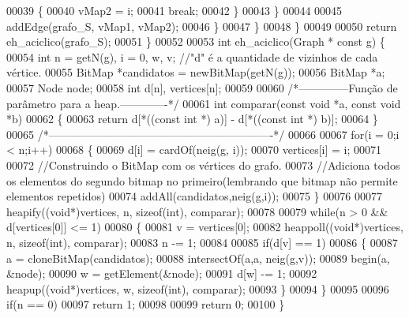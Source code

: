 \begin{DoxyCode}
00039                     \{
00040                         vMap2 = i;
00041                         \textcolor{keywordflow}{break};
00042                     \}
00043                 \}
00044 
00045                                 addEdge(grafo\_S, vMap1, vMap2);
00046                         \}
00047                 \}
00048         \}
00049 
00050         \textcolor{keywordflow}{return} eh_aciclico(grafo\_S);
00051 \}
00052 
00053 \textcolor{keywordtype}{int} eh_aciclico(Graph * \textcolor{keyword}{const} g) \{
00054         \textcolor{keywordtype}{int} n = getN(g), i = 0, w, v; \textcolor{comment}{//"d" é a quantidade de vizinhos de cada vértice.}
00055         BitMap *candidatos = newBitMap(getN(g));
00056         BitMap *a;
00057         Node node;
00058     \textcolor{keywordtype}{int} d[n], vertices[n];
00059 
00060     \textcolor{comment}{/*--------------Função de parâmetro para a heap.-------------*/}
00061     \textcolor{keywordtype}{int} comparar(\textcolor{keyword}{const} \textcolor{keywordtype}{void} *a, \textcolor{keyword}{const} \textcolor{keywordtype}{void} *b) 
00062     \{
00063         \textcolor{keywordflow}{return} d[*((\textcolor{keyword}{const} \textcolor{keywordtype}{int} *) a)] - d[*((\textcolor{keyword}{const} \textcolor{keywordtype}{int} *) b)];
00064     \}
00065     \textcolor{comment}{/*-------------------------------------------------------------*/}
00066 
00067         \textcolor{keywordflow}{for}(i = 0;i < n;i++)
00068         \{
00069                 d[i] = cardOf(neig(g, i));
00070         vertices[i] = i;
00071 
00072                 \textcolor{comment}{//Construindo o BitMap com os vértices do grafo.}
00073         \textcolor{comment}{//Adiciona todos os elementos do segundo bitmap no primeiro(lembrando que bitmap não permite
       elementos repetidos)}
00074                 addAll(candidatos,neig(g,i));
00075         \}
00076 
00077     heapify((\textcolor{keywordtype}{void}*)vertices, n, \textcolor{keyword}{sizeof}(\textcolor{keywordtype}{int}), comparar);
00078 
00079         \textcolor{keywordflow}{while}(n > 0 && d[vertices[0]] <= 1)
00080         \{
00081                 v = vertices[0];
00082         heappoll((\textcolor{keywordtype}{void}*)vertices, n, \textcolor{keyword}{sizeof}(\textcolor{keywordtype}{int}), comparar);
00083                 n -= 1;
00084 
00085                 \textcolor{keywordflow}{if}(d[v] == 1)
00086                 \{
00087                         a = cloneBitMap(candidatos);
00088                         intersectOf(a,a, neig(g,v));
00089                         begin(a, &node);
00090                         w = getElement(&node);
00091                         d[w] -= 1;
00092             heapup((\textcolor{keywordtype}{void}*)vertices, w, \textcolor{keyword}{sizeof}(\textcolor{keywordtype}{int}), comparar);
00093                 \}
00094         \}
00095 
00096         \textcolor{keywordflow}{if}(n == 0)
00097                 \textcolor{keywordflow}{return} 1;
00098 
00099         \textcolor{keywordflow}{return} 0;
00100 \}
\end{DoxyCode}
